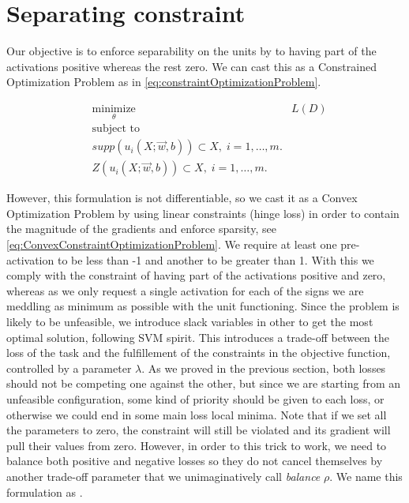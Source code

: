 
\section{Separating constraint}

Our objective is to enforce separability on the units by to having part of the activations positive whereas the rest zero. We can cast this as a Constrained Optimization Problem as in \ref{eq:constraintOptimizationProblem}. 

\begin{equation}\label{eq:constraintOptimizationProblem}
\begin{aligned}
&\underset{\theta}{\text{minimize}} &  L(D) \\
& \text{subject to}\\
&  supp(u_i(X;\vec{w},b)) \subset X, \; i = 1, \ldots, m.\\
&  Z(u_i(X;\vec{w},b))\subset X, \; i = 1, \ldots, m.
\end{aligned}
\end{equation}

However, this formulation is not differentiable, so we cast it as a Convex Optimization Problem\cite{boyd} by using linear constraints (hinge loss) in order to contain the magnitude of the gradients and enforce sparsity\cite{linearGradientMagnitude}\cite{l1sparsity}, see \ref{eq:ConvexConstraintOptimizationProblem}. We require at least one pre-activation to be less than -1 and another to be greater than 1. With this we comply with the constraint of having part of the activations positive and zero, whereas as we only request a single activation for each of the signs we are meddling as minimum as possible with the unit functioning. Since the problem is likely to be unfeasible, we introduce slack variables in other to get the most optimal solution, following SVM spirit. This introduces a trade-off between the loss of the task and the fulfillement of the constraints in the objective function, controlled by a parameter $\lambda$. As we proved in the previous section, both losses should not be competing one against the other, but since we are starting from an unfeasible configuration, some kind of priority should be given to each loss, or otherwise we could end in some main loss local minima. Note that if we set all the parameters to zero, the constraint will still be violated and its gradient will pull their values from zero. However, in order to this trick to work, we need to balance both positive and negative losses so they do not cancel themselves by another trade-off parameter that we unimaginatively call \emph{balance} $\rho$. We name this formulation as \SepUnit.

